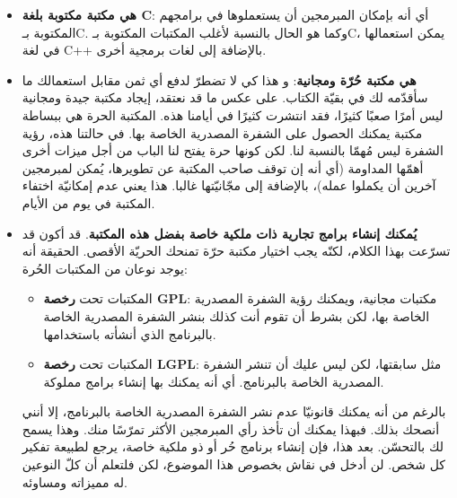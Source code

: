 \begin{itemize}
	\item \textbf{هي مكتبة مكتوبة بلغة
	\textenglish{C}}:
	 أي أنه بإمكان المبرمجين أن يستعملوها في برامجهم المكتوبة بـ\textenglish{C}.
	 وكما هو الحال بالنسبة لأغلب المكتبات المكتوبة بـ\textenglish{C}،
	 يمكن استعمالها في لغة \textenglish{C++}
	 بالإضافة إلى لغات برمجية أخرى.
	 \item \textbf{هي مكتبة حُرّة ومجانية}:
و هذا كي لا تضطرّ لدفع أي ثمن مقابل استعمالك ما سأقدّمه لك في بقيّة الكتاب. على عكس ما قد نعتقد، إيجاد مكتبة جيدة ومجانية ليس أمرًا صعبًا كثيرًا، فقد انتشرت كثيرًا في أيامنا هذه. المكتبة الحرة هي ببساطة مكتبة يمكنك الحصول على الشفرة المصدرية الخاصة بها. في حالتنا هذه، رؤية الشفرة ليس مُهمّا بالنسبة لنا. لكن كونها حرة يفتح لنا الباب من أجل ميزات أخرى أهمّها المداومة (أي أنه إن توقف صاحب المكتبة عن تطويرها، يُمكن لمبرمجين آخرين أن يكملوا عمله)، بالإضافة إلى مجّانيّتها غالبا. هذا يعني عدم إمكانيّة اختفاء المكتبة في يوم من الأيام.
	 \item \textbf{يُمكنك إنشاء برامج تجارية ذات ملكية خاصة بفضل هذه المكتبة}.
	 قد أكون قد تسرّعت بهذا الكلام، لكنّه يجب اختيار مكتبة حرّة تمنحك الحريّة الأقصى. الحقيقة أنه يوجد نوعان من المكتبات الحُرة:
	 
	 \begin{itemize}
	 	\item المكتبات تحت 
	 	\textbf{رخصة \textenglish{GPL}}:
	 	 مكتبات مجانية، ويمكنك رؤية الشفرة المصدرية الخاصة بها، لكن بشرط أن تقوم أنت كذلك بنشر الشفرة المصدرية الخاصة بالبرنامج الذي أنشأته باستخدامها.
	 	\item المكتبات تحت 
	 	\textbf{رخصة \textenglish{LGPL}}:
	 	مثل سابقتها، لكن ليس عليك أن تنشر الشفرة المصدرية الخاصة بالبرنامج. أي أنه يمكنك بها إنشاء برامج مملوكة.
	 \end{itemize}
 	
 	\begin{information}
بالرغم من أنه يمكنك قانونيّا عدم نشر الشفرة المصدرية الخاصة بالبرنامج، إلا أنني أنصحك بذلك. فبهذا يمكنك أن تأخذ رأي المبرمجين الأكثر تمرّسًا منك. وهذا يسمح لك بالتحسّن. بعد هذا، فإن إنشاء برنامج حُر أو ذو ملكية خاصة، يرجع لطبيعة تفكير كل شخص. لن أدخل في نقاش بخصوص هذا الموضوع، لكن فلتعلم أن كلّ النوعين له مميزاته ومساوئه.
 	\end{information}


\end{itemize}
